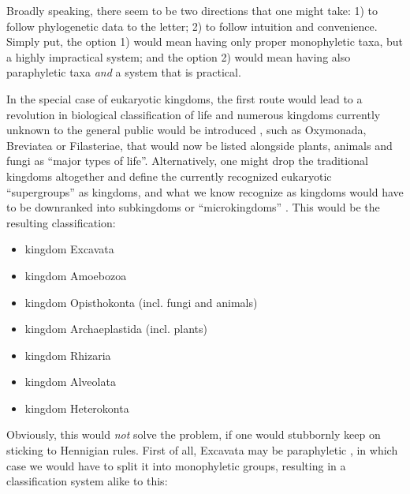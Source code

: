 \begin{artengenv}
Broadly speaking, there seem to be two directions that one might take: 1) to follow phylogenetic data to the letter; 2)
to follow intuition and convenience. Simply put, the option 1) would mean having only proper monophyletic taxa, but a
highly impractical system; and the option 2) would mean having also paraphyletic taxa \textit{and} a system that is
practical.

In the special case of eukaryotic kingdoms, the first route would lead to a revolution in biological classification of
life and numerous kingdoms currently unknown to the general public would be introduced
\parencite{tedersoo_proposal_2017},
such as Oxymonada, Breviatea or Filasteriae, that would now be listed
alongside plants, animals and fungi as ``major types of life''. Alternatively, one might drop the traditional kingdoms
altogether and define the currently recognized eukaryotic ``supergroups''
\parencite[e.g.][]{keeling_tree_2005}
as kingdoms, and what we know recognize as kingdoms would have to be downranked into subkingdoms or
``microkingdoms''
\parencite{pawlowski_new_2013}.
This would be the resulting classification:

\begin{itemize}
\item kingdom Excavata
\item kingdom Amoebozoa
\item kingdom Opisthokonta (incl. fungi and animals)
\item kingdom Archaeplastida (incl. plants)
\item kingdom Rhizaria
\item kingdom Alveolata
\item kingdom Heterokonta
\end{itemize}
Obviously, this would \textit{not} solve the problem, if one would stubbornly keep on sticking to Hennigian rules. First
of all, Excavata may be paraphyletic
\parencite{he_alternative_2014},
in which case we would have to split
it into monophyletic groups, resulting in a classification system alike to this:


\end{artengenv}
